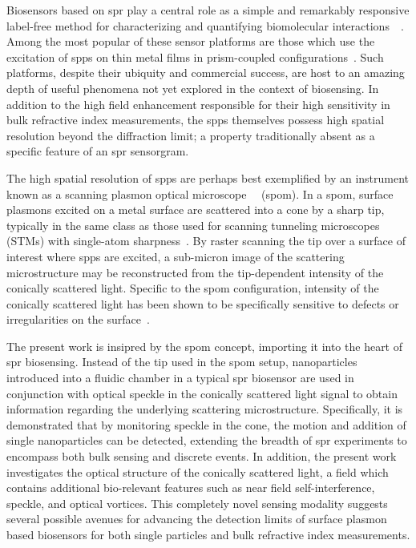 Biosensors based on \gls{spr} play a central role as a simple and remarkably
responsive label-free method for characterizing and quantifying biomolecular
interactions~\cite{homola1999surface}~\cite{homola2006surface}.  Among the most
popular of these sensor platforms are those which use the excitation of
\glspl{spp} on thin metal films in prism-coupled
configurations~\cite{hoa2007towards}.  Such platforms, despite their ubiquity
and commercial success, are host to an amazing depth of useful phenomena not
yet explored in the context of biosensing.  In addition to the high field
enhancement responsible for their high sensitivity in bulk refractive index
measurements, the \glspl{spp} themselves possess high spatial resolution beyond the
diffraction limit; a property traditionally absent as a specific feature of an
\gls{spr} sensorgram.

The high spatial resolution of \glspl{spp} are perhaps best exemplified by an
instrument known as a scanning plasmon optical
microscope~\cite{kim1995scanning}~\cite{kim1996scanning} (\gls{spom}).  In a \gls{spom},
surface plasmons excited on a metal surface are scattered into a cone by
a sharp tip, typically in the same class as those used for scanning tunneling
microscopes (STMs) with single-atom sharpness~\cite{binnig2000scanning}.  By
raster scanning the tip over a surface of interest where spps are excited,
a sub-micron image of the scattering microstructure may be reconstructed from
the tip-dependent intensity of the conically scattered light.  Specific to the
\gls{spom} configuration, intensity of the conically scattered light has been shown
to be specifically sensitive to defects or irregularities on the
surface~\cite{kim1996scanning}.

The present work is insipred by the \gls{spom} concept, importing it into the heart
of \gls{spr} biosensing.  Instead of the tip used in the \gls{spom} setup,
nanoparticles introduced into a fluidic chamber in a typical \gls{spr} biosensor
are used in conjunction with optical speckle in the conically scattered light
signal to obtain information regarding the underlying scattering
microstructure.  Specifically, it is demonstrated that by monitoring speckle in
the cone, the motion and addition of single nanoparticles can be detected,
extending the breadth of \gls{spr} experiments to encompass both bulk sensing
and discrete events.  In addition, the present work investigates the optical
structure of the conically scattered light, a field which contains additional
bio-relevant features such as near field self-interference, speckle, and
optical vortices.  This completely novel sensing modality suggests several
possible avenues for advancing the detection limits of surface plasmon based
biosensors for both single particles and bulk refractive index measurements.
